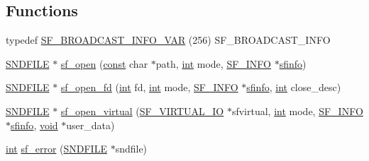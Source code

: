 \subsection*{Functions}
\begin{DoxyCompactItemize}
\item 
typedef \hyperlink{mac_2config_2i386_2lib-src_2libsndfile_2src_2sndfile_8h_a681b92a0003d2990ce7f0868e50d2483}{S\+F\+\_\+\+B\+R\+O\+A\+D\+C\+A\+S\+T\+\_\+\+I\+N\+F\+O\+\_\+\+V\+AR} (256) S\+F\+\_\+\+B\+R\+O\+A\+D\+C\+A\+S\+T\+\_\+\+I\+N\+FO
\item 
\hyperlink{mac_2config_2i386_2lib-src_2libsndfile_2src_2sndfile_8h_ac14209bc83d532b06a8cdf9ade6d544a}{S\+N\+D\+F\+I\+LE} $\ast$ \hyperlink{mac_2config_2i386_2lib-src_2libsndfile_2src_2sndfile_8h_a61bb810d2581bc860cd8884e22d6c7d2}{sf\+\_\+open} (\hyperlink{getopt1_8c_a2c212835823e3c54a8ab6d95c652660e}{const} char $\ast$path, \hyperlink{xmltok_8h_a5a0d4a5641ce434f1d23533f2b2e6653}{int} mode, \hyperlink{struct_s_f___i_n_f_o}{S\+F\+\_\+\+I\+N\+FO} $\ast$\hyperlink{frontend_8c_a6993a4314b1f21cc6aa5614009106c94}{sfinfo})
\item 
\hyperlink{mac_2config_2i386_2lib-src_2libsndfile_2src_2sndfile_8h_ac14209bc83d532b06a8cdf9ade6d544a}{S\+N\+D\+F\+I\+LE} $\ast$ \hyperlink{mac_2config_2i386_2lib-src_2libsndfile_2src_2sndfile_8h_a0480812421818e88cc6032834ec14431}{sf\+\_\+open\+\_\+fd} (\hyperlink{xmltok_8h_a5a0d4a5641ce434f1d23533f2b2e6653}{int} fd, \hyperlink{xmltok_8h_a5a0d4a5641ce434f1d23533f2b2e6653}{int} mode, \hyperlink{struct_s_f___i_n_f_o}{S\+F\+\_\+\+I\+N\+FO} $\ast$\hyperlink{frontend_8c_a6993a4314b1f21cc6aa5614009106c94}{sfinfo}, \hyperlink{xmltok_8h_a5a0d4a5641ce434f1d23533f2b2e6653}{int} close\+\_\+desc)
\item 
\hyperlink{mac_2config_2i386_2lib-src_2libsndfile_2src_2sndfile_8h_ac14209bc83d532b06a8cdf9ade6d544a}{S\+N\+D\+F\+I\+LE} $\ast$ \hyperlink{mac_2config_2i386_2lib-src_2libsndfile_2src_2sndfile_8h_a3659e9ca9e6677e713e5b509f8653c04}{sf\+\_\+open\+\_\+virtual} (\hyperlink{struct_s_f___v_i_r_t_u_a_l___i_o}{S\+F\+\_\+\+V\+I\+R\+T\+U\+A\+L\+\_\+\+IO} $\ast$sfvirtual, \hyperlink{xmltok_8h_a5a0d4a5641ce434f1d23533f2b2e6653}{int} mode, \hyperlink{struct_s_f___i_n_f_o}{S\+F\+\_\+\+I\+N\+FO} $\ast$\hyperlink{frontend_8c_a6993a4314b1f21cc6aa5614009106c94}{sfinfo}, \hyperlink{sound_8c_ae35f5844602719cf66324f4de2a658b3}{void} $\ast$user\+\_\+data)
\item 
\hyperlink{xmltok_8h_a5a0d4a5641ce434f1d23533f2b2e6653}{int} \hyperlink{mac_2config_2i386_2lib-src_2libsndfile_2src_2sndfile_8h_ab61fee56583f21faaeec05321005bf77}{sf\+\_\+error} (\hyperlink{mac_2config_2i386_2lib-src_2libsndfile_2src_2sndfile_8h_ac14209bc83d532b06a8cdf9ade6d544a}{S\+N\+D\+F\+I\+LE} $\ast$sndfile)

\end{DoxyCompactItemize}
